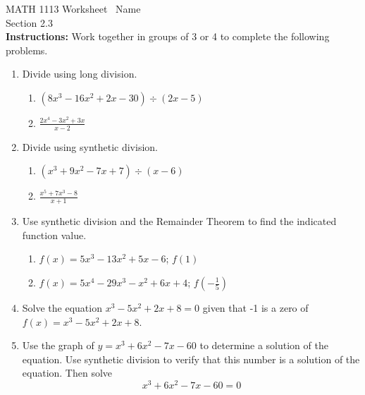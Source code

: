 \documentclass[11pt]{article}
\begin{document}
\noindent MATH 1113   \quad\quad\quad\quad\quad Worksheet \quad\quad\quad\quad\quad\   Name \underline{\phantom{alphabetsoupismyveryveryfavorite}}\\ 
\noindent Section 2.3 \\




\noindent \textbf{Instructions:}  Work together in groups of  3 or 4 to complete the following problems.\\

\begin{enumerate}



\item Divide using long division.
\begin{enumerate}
\item $(8x^3-16x^2+2x-30)\div (2x-5)$
\vfill

\item $\displaystyle \frac{2x^4-3x^2+3x}{x-2}$
\vfill

\end{enumerate}

\newpage


\item Divide using synthetic division.

\begin{enumerate}

\item $(x^3+9x^2-7x+7)\div (x-6)$
\vfill
\item $\displaystyle \frac{x^5+7x^3-8}{x+1}$
\vfill

\end{enumerate}

\item Use synthetic division and the Remainder Theorem to find the indicated function value.
\begin{enumerate}
\item $f(x)=5x^3-13x^2+5x-6$; $f(1)$
\vfill
\item $f(x)=5x^4-29x^3-x^2+6x+4$; $\displaystyle f(-\frac{1}{5})$
\end{enumerate}

\vfill

\newpage
\item Solve the equation $x^3-5x^2+2x+8=0$ given that -1 is a zero of $f(x)=x^3-5x^2+2x+8$.

\vfill


\item Use the graph of $y=x^3+6x^2-7x-60$ to determine a solution of the equation.  Use synthetic division to verify that this number is a solution of the equation.  Then solve $$x^3+6x^2-7x-60=0$$


\end{enumerate}
\end{document}
